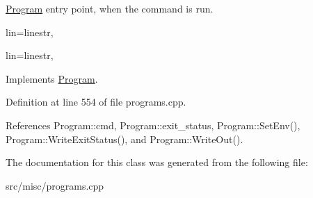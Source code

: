 \hyperlink{classProgram}{Program} entry point, when the command is run. 

lin=linestr,

lin=linestr, 

Implements \hyperlink{classProgram_acd37c94c3c12a55650a05ee1449aa176}{Program}.



Definition at line 554 of file programs.\-cpp.



References Program\-::cmd, Program\-::exit\-\_\-status, Program\-::\-Set\-Env(), Program\-::\-Write\-Exit\-Status(), and Program\-::\-Write\-Out().



The documentation for this class was generated from the following file\-:\begin{DoxyCompactItemize}
\item 
src/misc/programs.\-cpp\end{DoxyCompactItemize}
